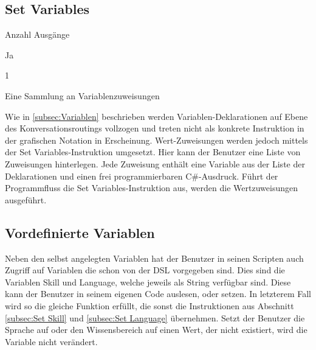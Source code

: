 \subsection{Set Variables}
\label{subsec:Set Variables}
\begin{labeling}{Anzahl Ausgänge}
\item [Eingang] Ja
\item [Anzahl Ausgänge] 1
\item [Parameter] Eine Sammlung an Variablenzuweisungen
\item [Beschreibung] Wie in \ref{subsec:Variablen} beschrieben werden Variablen-Deklarationen auf Ebene des Konversationsroutings vollzogen und treten nicht als konkrete Instruktion in der grafischen Notation in Erscheinung. Wert-Zuweisungen werden jedoch mittels der Set Variables-Instruktion umgesetzt. Hier kann der Benutzer eine Liste von Zuweisungen hinterlegen. Jede Zuweisung enthält eine Variable aus der Liste der Deklarationen und einen frei programmierbaren C\#-Ausdruck. Führt der Programmfluss die Set Variables-Instruktion aus, werden die Wertzuweisungen ausgeführt.
\end{labeling}

\subsection{Vordefinierte Variablen}
Neben den selbst angelegten Variablen hat der Benutzer in seinen Scripten auch Zugriff auf Variablen die schon von der DSL vorgegeben sind. Dies sind die Variablen Skill und Language, welche jeweils als String verfügbar sind. Diese kann der Benutzer in seinem eigenen Code auslesen, oder setzen. In letzterem Fall wird so die gleiche Funktion erfüllt, die sonst die Instruktionen aus Abschnitt \ref{subsec:Set Skill} und \ref{subsec:Set Language} übernehmen. Setzt der Benutzer die Sprache auf oder den Wissensbereich auf einen Wert, der nicht existiert, wird die Variable nicht verändert. 

